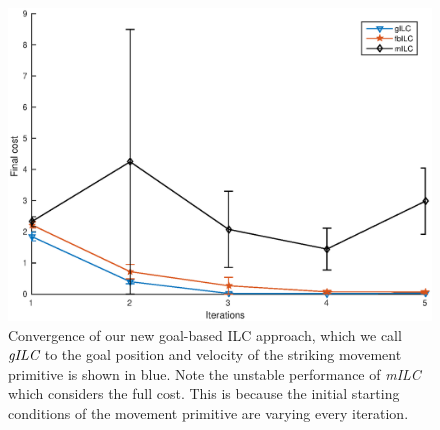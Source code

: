 \begin{figure}
\center
\includegraphics[scale=0.40]{tt0.eps}
\caption{Convergence of our new goal-based ILC approach, which we call $\emph{gILC}$ to the goal position and velocity of the striking movement primitive is shown in blue. Note the unstable performance of \emph{mILC} which considers the full cost. This is because the initial starting conditions of the movement primitive are varying every iteration.}
\label{ILCTrajectoryTT}
\end{figure}